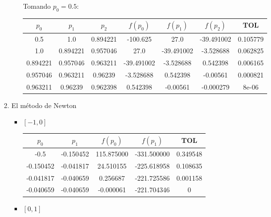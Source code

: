 \documentclass[12pt]{article}
\begin{document}
\begin{enumerate}
\begin{enumerate}
\begin{itemize}
            Tomando \(p_0 = 0.5\): 
            \begin{center}
            \begin{tabular}{|c|c|c|c|c|c|c|}
            \hline
            \(p_0\) & \(p_1\)& \(p_2\)&\(f(p_0)\) & \(f(p_1)\) & \(f(p_2)\)&\textbf{TOL} \\
            \hline
            0.5 & 1.0 & 0.894221 & -100.625 & 27.0 & -39.491002 & 0.105779 \\
            1.0 & 0.894221 & 0.957046 & 27.0 & -39.491002 & -3.528688 & 0.062825 \\
            0.894221 & 0.957046 & 0.963211 & -39.491002 & -3.528688 & 0.542398 & 0.006165 \\
            0.957046 & 0.963211 & 0.96239 & -3.528688 & 0.542398 & -0.00561 & 0.000821 \\
            0.963211 & 0.96239 & 0.962398 & 0.542398 & -0.00561 & -0.000279 & 8e-06 \\
            \hline 
            \end{tabular}
            \end{center}
        \end{itemize}
        \item El método de Newton
        \begin{itemize}
            \item \([-1, 0]\)
            
        \begin{center}
        \begin{tabular}{|c|c|c|c|c|}
        \hline
        \(p_0\) & \(p_1\)& \(f(p_0)\) & \(f(p_1)\) & \textbf{TOL} \\
        \hline
        -0.5 & -0.150452 & 115.875000 & -331.500000 &  0.349548 \\
        -0.150452 & -0.041817 & 24.510155 & -225.618958 &  0.108635 \\
        -0.041817 & -0.040659 & 0.256687 & -221.725586 &  0.001158 \\
        -0.040659 & -0.040659 & -0.000061 & -221.704346 &  0 \\
        \hline 
        \end{tabular}
        \end{center}
            \item \([0, 1]\)
            

\end{itemize}
\end{enumerate}
\end{enumerate}
\end{document}
